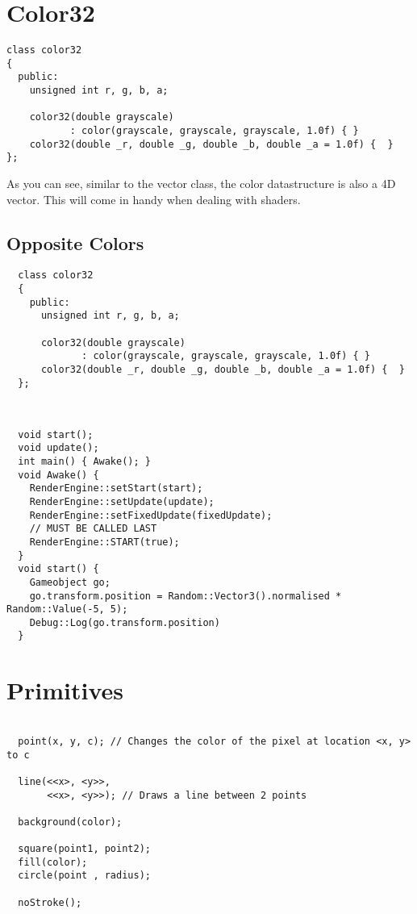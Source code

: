 
\section*{Color32}


\begin{lstlisting}
class color32
{
  public:
    unsigned int r, g, b, a;

    color32(double grayscale) 
           : color(grayscale, grayscale, grayscale, 1.0f) { }
    color32(double _r, double _g, double _b, double _a = 1.0f) {  }
};
\end{lstlisting}




As you can see, similar to the vector class, the color datastructure is also a 4D vector. This will come in handy when dealing with shaders. 


  \subsection*{Opposite Colors}
  \begin{lstlisting}
  class color32
  {
    public:
      unsigned int r, g, b, a;

      color32(double grayscale) 
             : color(grayscale, grayscale, grayscale, 1.0f) { }
      color32(double _r, double _g, double _b, double _a = 1.0f) {  }
  };



  \end{lstlisting}


  \begin{lstlisting}
  void start();
  void update();
  int main() { Awake(); }
  void Awake() {
    RenderEngine::setStart(start);
    RenderEngine::setUpdate(update);
    RenderEngine::setFixedUpdate(fixedUpdate);
    // MUST BE CALLED LAST
    RenderEngine::START(true);
  }
  void start() {
    Gameobject go;
    go.transform.position = Random::Vector3().normalised *  Random::Value(-5, 5); 
    Debug::Log(go.transform.position)
  }
  \end{lstlisting}


\section*{Primitives}


\begin{lstlisting}

  point(x, y, c); // Changes the color of the pixel at location <x, y> to c

  line(<<x>, <y>>, 
       <<x>, <y>>); // Draws a line between 2 points

  background(color);

  square(point1, point2);
  fill(color);
  circle(point , radius);

  noStroke();
\end{lstlisting}

